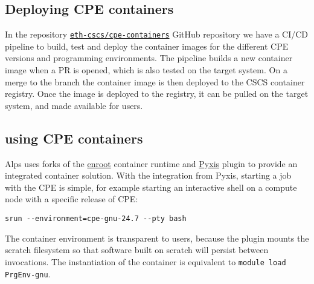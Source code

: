 \subsection{Deploying CPE containers}
\label{sec:cpe-container-deploy}

In the repository \href{https://github.com/eth-cscs/cpe-containers}{\lstinline{eth-cscs/cpe-containers}} GitHub repository we have a CI/CD pipeline to build, test and deploy the container images for the different CPE versions and programming environments.
The pipeline builds a new container image when a PR is opened, which is also tested on the target system.
On a merge to the  branch the container image is then deployed to the CSCS container registry.
Once the image is deployed to the registry, it can be pulled on the target system, and made available for users.

\subsection{using CPE containers}
\label{sec:cpe-container-use}

Alps uses forks of the \href{https://github.com/NVIDIA/enroot}{enroot} container runtime and \href{https://github.com/NVIDIA/pyxis}{Pyxis} \slurm plugin to provide an integrated container solution.
With the \slurm integration from Pyxis, starting a job with the CPE is simple, for example starting an interactive shell on a compute node with a specific release of CPE:
\begin{lstlisting}
srun --environment=cpe-gnu-24.7 --pty bash
\end{lstlisting}
The container environment is transparent to users, because the \slurm plugin mounts the scratch filesystem so that software built on scratch will persist between invocations.
The instantiation of the container is equivalent to \lstinline{module load PrgEnv-gnu}.
